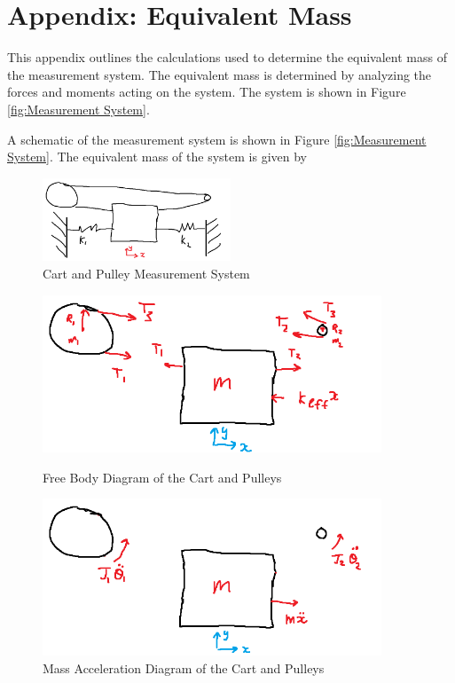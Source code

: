 \section{Appendix: Equivalent Mass}
\label{app:Equivalent Mass Derivation}
This appendix outlines the calculations used to determine the equivalent mass of the measurement system. The equivalent mass is determined by analyzing the forces and moments acting on the system. The system is shown in Figure \ref{fig:Measurement System}.

A schematic of the measurement system is shown in Figure \ref{fig:Measurement System}. The equivalent mass of the system is given by
\begin{figure}[H]
    \centering
    \includegraphics[width=0.5\textwidth]{Sections/Figures/system.png}
    \caption{Cart and Pulley Measurement System}
    \label{fig:Measurement System Appendix}
\end{figure}
\begin{figure}[h]
    \centering 
    \begin{minipage}{0.45\textwidth}
        \centering
        \includegraphics[width=0.9\textwidth]{Sections/Figures/fbd.png}
        \caption{Free Body Diagram of the Cart and Pulleys}
        \label{fig:Cart FBD Appendix}
    \end{minipage}\qquad
    \begin{minipage}{0.45\textwidth}
        \centering
        \includegraphics[width=0.9\textwidth]{Sections/Figures/mad.png}
        \caption{Mass Acceleration Diagram of the Cart and Pulleys}
        \label{fig:Cart MAD Appendix}
    \end{minipage}  
\end{figure}
